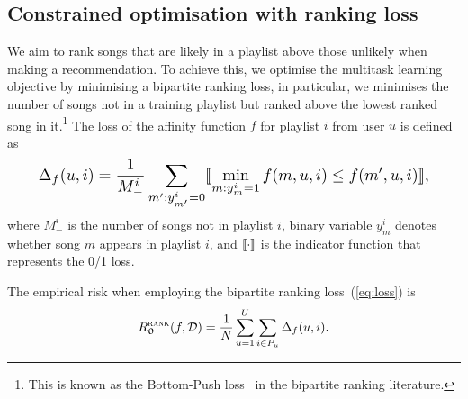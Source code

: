 \subsection{Constrained optimisation with ranking loss}

We aim to rank songs that are likely in a playlist above those unlikely when making a recommendation.
To achieve this, we optimise the multitask learning objective by minimising a bipartite ranking loss,
in particular, we minimises the number of songs not in a training playlist but ranked above the lowest 
ranked song in it.\footnote{This is known as the Bottom-Push loss~\cite{rudin2009p} in the bipartite ranking literature.}
The loss of the affinity function $f$ for playlist $i$ from user $u$ is defined as
\begin{equation}
\label{eq:loss}
\resizebox{.9\columnwidth}{!}{$
\Delta_f(u, i) 
= \displaystyle \frac{1}{M_-^i} \sum_{m': y_{m'}^i = 0} \llb \min_{m: y_m^i = 1} f(m, u, i) \le f(m', u, i) \rrb,
$}
\end{equation}
where $M_-^i$ is the number of songs not in playlist $i$,
binary variable $y_m^i$ denotes whether song $m$ appears in playlist $i$,
and $\llbracket \cdot \rrbracket$ is the indicator function that represents the 0/1 loss.

The empirical risk when employing the bipartite ranking loss~(\ref{eq:loss}) is
\vspace{-1em}
\begin{equation}
\label{eq:risk_rank}
R_{{\bm{\uptheta}}}^{\textsc{rank}}(f, \mathcal{D}) = \frac{1}{N} \sum_{u=1}^U \sum_{i \in P_u} \Delta_f(u, i).
\end{equation}
%
%


